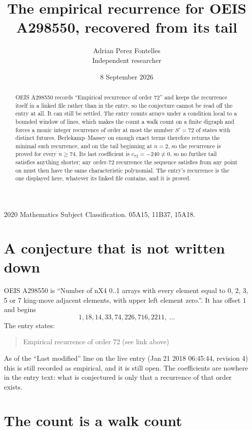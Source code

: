 \documentclass[11pt,a4paper]{article}
\title{The empirical recurrence for OEIS A298550, recovered from its tail}
\author{Adrian Perez Fontelles\\ \small Independent researcher}
\date{8 September 2026}
\theoremstyle{plain}
\theoremstyle{definition}
\begin{document}
\maketitle

\begin{abstract}
OEIS A298550 records ``Empirical recurrence of order $72$'' and keeps the recurrence itself in
a linked file rather than in the entry, so the conjecture cannot be read off the entry at all.
It can still be settled. The entry counts arrays under a condition local to a bounded window of
lines, which makes the count a walk count on a finite digraph and forces a monic integer
recurrence of order at most the number $S'=72$ of states with distinct futures. Berlekamp--Massey on
enough exact terms therefore returns the minimal such recurrence, and on the tail beginning at $n=2$, so the recurrence is proved for every $n\ge74$.
Its last coefficient is $c_{72}=-240\neq0$, so no further tail satisfies anything
shorter; any order-$72$ recurrence the sequence satisfies from any point on must then have
the same characteristic polynomial. The entry's recurrence is the one displayed here, whatever
its linked file contains, and it is proved.
\end{abstract}

\noindent\small 2020 Mathematics Subject Classification. 05A15, 11B37, 15A18.\normalsize

\section{A conjecture that is not written down}

OEIS A298550 is ``Number of nX4 0..1 arrays with every element equal to 0, 2, 3, 5 or 7 king-move adjacent elements, with upper left element zero.''. It has offset $1$ and begins
\[
1, 18, 14, 33, 74, 226, 716, 2211,\ \dots
\]
The entry states:
\begin{quote}
Empirical recurrence of order 72 (see link above)
\end{quote}
As of the ``Last modified'' line on the live entry (Jan 21 2018 06:45:44, revision 4)
this is still recorded as empirical, and it is still open. The coefficients are nowhere in the
entry text: what is conjectured is only that a recurrence of that order exists.

\section{The count is a walk count}
\end{document}
